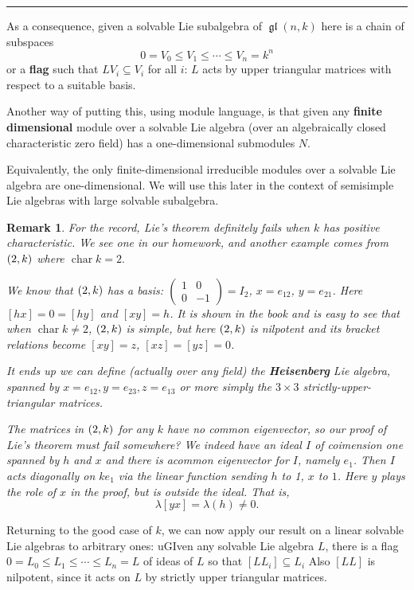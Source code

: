 \documentclass[12pt]{article}
\theoremstyle{nonumberbreak}
\theoremstyle{changebreak}
\theoremstyle{nonumberbreak}
\theoremstyle{change}
\newtheorem{rmk}[thm]{Remark}
\newcommand*{\brk}{
\rule{2in}{.1pt}
}
\DeclareMathOperator{\ch}{char}
\DeclareMathOperator{\gl}{\mathfrak{gl}}
\let\sl\relax
\DeclareMathOperator{\sl}{\mathfrak{sl}}
\begin{document}
\brk

As a consequence, given a solvable Lie subalgebra of $\gl(n,k)$ here is a chain of subspaces
\[0=V_0\le V_1\le\cdots\le V_n=k^n\]
or a \textbf{flag} such that $LV_i\subseteq V_i$ for all $i$: $L$ acts by upper triangular 
matrices with respect to a suitable basis.

Another way of putting this, using module language, is that given any \textbf{finite dimensional} module over
a solvable Lie algebra (over an algebraically closed characteristic zero field) has a one-dimensional submodules $N$.

Equivalently, the only finite-dimensional irreducible modules over a solvable Lie algebra are one-dimensional. We 
will use this later in the context of semisimple Lie algebras with large solvable subalgebra.

\begin{rmk}
	For the record, Lie's theorem \textit{definitely fails} when $k$ has positive characteristic.
	We see one in our homework, and another example comes from $\sl(2,k)$ where $\ch k=2.$

	We know that $\sl(2,k)$ has a basis: $(\begin{smallmatrix}
		1&0\\0&-1
	\end{smallmatrix})=I_2$, $x=e_{12}$, $y=e_{21}$. Here $[hx]=0=[hy]$ and $[xy]=h$. It is shown in the book
	and is easy to see that when $\ch k\ne 2$, $\sl(2,k)$ is simple, but here $\sl(2,k)$ is nilpotent and its
	bracket relations become $[xy]=z$, $[xz]=[yz]=0$.

	It ends up we can define (actually over any field) the \textbf{Heisenberg} Lie algebra, spanned
	by $x=e_{12},y=e_{23},z=e_{13}$ or more simply the $3\times 3$ strictly-upper-triangular matrices.

	The matrices in $\sl(2,k)$ for any $k$ have no common eigenvector, so our proof of Lie's theorem must
	fail somewhere? We indeed have an ideal $I$ of coimension one spanned by $h$ and $x$ and there is acommon eigenvector for $I$, 
	namely $e_1$. Then $I$ acts diagonally on $ke_1$ via the linear function sending $h$ to 1, $x$ to $1$. 
	Here $y$ plays the role of $x$ in the proof, but is outside the ideal. That is,
	\[\lambda[yx]=\lambda(h)\ne 0.\]
\end{rmk}

Returning to the good case of $k$, we can now apply our result on a linear solvable Lie algebras to arbitrary ones:
uGIven any solvable Lie algebra $L$, there is a flag $0=L_0\le L_1\le\cdots\le L_n=L$ of ideas of $L$
so that $[LL_i]\subseteq L_i$ Also $[LL]$ is nilpotent, since it acts on $L$ by strictly upper triangular matrices.
\end{document}

